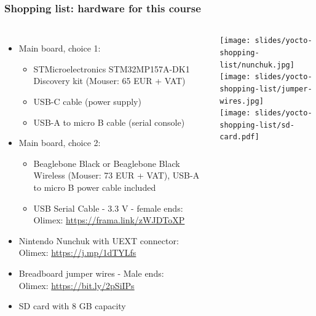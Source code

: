 \begin{frame}
\frametitle{Shopping list: hardware for this course}
  \begin{columns}
    \footnotesize
    \begin{itemize}
      \item Main board, choice 1:
      \begin{itemize}
        \item STMicroelectronics STM32MP157A-DK1 Discovery kit
        (Mouser: 65 EUR + VAT)
        \item USB-C cable (power supply)
        \item USB-A to micro B cable (serial console)
      \end{itemize}
      \item Main board, choice 2:
      \begin{itemize}
        \item Beaglebone Black or Beaglebone Black Wireless
        (Mouser: 73 EUR + VAT), USB-A to micro B power cable included
        \item USB Serial Cable - 3.3 V - female ends: \\
        Olimex: \url{https://frama.link/zWJDToXP}
      \end{itemize}
      \item Nintendo Nunchuk with UEXT connector: \\
            Olimex: \url{https://j.mp/1dTYLfs}
      \item Breadboard jumper wires - Male ends: \\
            Olimex: \url{https://bit.ly/2pSiIPs}
      \item SD card with 8 GB capacity
    \end{itemize}
    \texttt{[image: slides/yocto-shopping-list/nunchuk.jpg]} \\
    \vspace{1cm}
    \texttt{[image: slides/yocto-shopping-list/jumper-wires.jpg]} \\
    \vspace{1cm}
    \texttt{[image: slides/yocto-shopping-list/sd-card.pdf]}
  \end{columns}
\end{frame}
